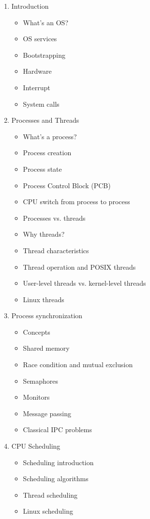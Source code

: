 \documentclass{wx672ctexart}
\begin{document}
\begin{enumerate}
\item Introduction
  \begin{itemize}
  \item What's an OS?
  \item OS services
  \item Bootstrapping
  \item Hardware
  \item Interrupt
  \item System calls
  \end{itemize}
\item Processes and Threads
  \begin{itemize}
  \item What's a process?
  \item Process creation
  \item Process state
  \item Process Control Block (PCB)
  \item CPU switch from process to process
  \item Processes vs. threads
  \item Why threads?
  \item Thread characteristics
  \item Thread operation and POSIX threads
  \item User-level threads vs. kernel-level threads
  \item Linux threads
  \end{itemize}
\item Process synchronization
  \begin{itemize}
  \item Concepts
  \item Shared memory
  \item Race condition and mutual exclusion
  \item Semaphores
  \item Monitors
  \item Message passing
  \item Classical IPC problems
  \end{itemize}
\item CPU Scheduling
  \begin{itemize}
  \item Scheduling introduction
  \item Scheduling algorithms
  \item Thread scheduling
  \item Linux scheduling
  \end{itemize}

\end{enumerate}
\end{document}
